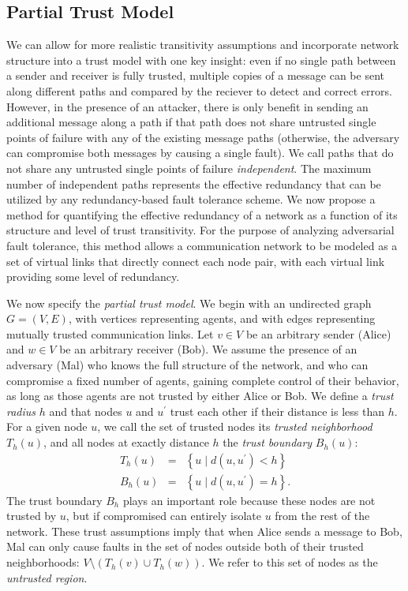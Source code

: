 \documentclass{sig-alternate-05-2015}
\newcommand{\beq}{\begin{eqnarray}}
\newcommand{\eeq}{\end{eqnarray}}
\begin{document}
\subsection{Partial Trust Model}

We can allow for more realistic transitivity assumptions and incorporate
network structure into a trust model with one key insight:
even if no single path between a sender and receiver is fully trusted,
multiple copies of a message can be sent along different paths and compared
by the reciever to detect and correct errors.
However, in the presence of an attacker, there is only benefit in sending an
additional message along a path if that path does not share untrusted
single points of failure with any of the existing message paths
(otherwise, the adversary can compromise both messages
by causing a single fault).
We call paths that do not share any untrusted single points of failure
{\em independent}.
The maximum number of independent paths represents the effective redundancy that
can be utilized by any redundancy-based fault tolerance scheme.
We now propose a method for quantifying the effective redundancy of a network
as a function of its structure and level of trust transitivity.
For the purpose of analyzing adversarial fault tolerance,
this method allows a communication network
to be modeled as a set of virtual links that directly
connect each node pair,
with each virtual link providing some level of redundancy.

We now specify the {\em partial trust model}.
We begin with an undirected graph $G = (V,E)$,
with vertices representing agents,
and with edges representing mutually trusted communication links.
Let $v \in V$ be an arbitrary sender (Alice)
and $w \in V$ be an arbitrary receiver (Bob).
We assume the presence of an adversary (Mal) who knows the
full structure of the network,
and who can compromise a fixed number of agents,
gaining complete control of their behavior,
as long as those agents are not trusted by either Alice or Bob.
We define a {\em trust radius} $h$ and that nodes $u$ and
$u^\prime$ trust each other if their distance is less than $h$.
For a given node $u$,
we call the set of trusted nodes its
{\em trusted neighborhood} $T_h(u)$,
and all nodes at exactly distance $h$ the
{\em trust boundary} $B_h(u)$:
\beq
T_h(u) &=& \left\{ u \mid d(u,u^\prime) < h \right\} \\
B_h(u) &=& \left\{ u \mid d(u,u^\prime) = h \right\}.
\eeq
The trust boundary $B_h$ plays an important role because these nodes are not
trusted by $u$,
but if compromised can entirely isolate $u$ from the rest of the network.
These trust assumptions imply that when Alice sends a message to Bob,
Mal can only cause faults in the set of nodes outside both of their trusted
neighborhoods: $V \setminus \left(T_h(v) \cup T_h(w)\right)$.
We refer to this set of nodes as the {\em untrusted region}.
\end{document}
